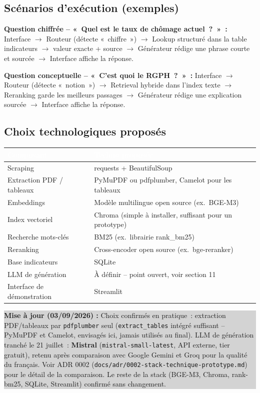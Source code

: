 \documentclass[11pt,a4paper]{article}
\newcommand{\tblhead}[1]{\textcolor{white}{\textbf{#1}}}
\newcommand{\majcadrage}[1]{%
\par\vspace{0.35cm}
\noindent\colorbox{lightgrey}{%
\begin{minipage}{\dimexpr\linewidth-2\fboxsep}
\vspace{0.15cm}
\textbf{\color{gold}Mise \`a jour (03/09/2026) :} #1
\vspace{0.15cm}
\end{minipage}%
}
\vspace{0.35cm}
}
\begin{document}
\subsection{Sc\'enarios d'ex\'ecution (exemples)}
\textbf{Question chiffr\'ee -- «~Quel est le taux de ch\^omage actuel~?~»~:} Interface $\rightarrow$ Routeur (d\'etecte «~chiffre~») $\rightarrow$ Lookup structur\'e dans la table indicateurs $\rightarrow$ valeur exacte + source $\rightarrow$ G\'en\'erateur r\'edige une phrase courte et sourc\'ee $\rightarrow$ Interface affiche la r\'eponse.

\textbf{Question conceptuelle -- «~C'est quoi le RGPH~?~»~:} Interface $\rightarrow$ Routeur (d\'etecte «~notion~») $\rightarrow$ Retrieval hybride dans l'index texte $\rightarrow$ Reranking garde les meilleurs passages $\rightarrow$ G\'en\'erateur r\'edige une explication sourc\'ee $\rightarrow$ Interface affiche la r\'eponse.

\subsection{Choix technologiques propos\'es}
\begin{longtable}{@{}p{5cm}p{10.2cm}@{}}
\rowcolor{navy}
\tblhead{Composant} & \tblhead{Techno propos\'ee} \\
\midrule
\endhead
Scraping & requests + BeautifulSoup \\
Extraction PDF / tableaux & PyMuPDF ou pdfplumber, Camelot pour les tableaux \\
Embeddings & Mod\`ele multilingue open source (ex.\ BGE-M3) \\
Index vectoriel & Chroma (simple \`a installer, suffisant pour un prototype) \\
Recherche mots-cl\'es & BM25 (ex.\ librairie rank\_bm25) \\
Reranking & Cross-encoder open source (ex.\ bge-reranker) \\
Base indicateurs & SQLite \\
LLM de g\'en\'eration & \`A d\'efinir -- point ouvert, voir section 11 \\
Interface de d\'emonstration & Streamlit \\
\end{longtable}

\majcadrage{Choix confirm\'es en pratique~: extraction PDF/tableaux par \texttt{pdfplumber} seul (\texttt{extract\_tables} int\'egr\'e suffisant -- PyMuPDF et Camelot, envisag\'es ici, jamais utilis\'es au final). LLM de g\'en\'eration tranch\'e le 21 juillet~: \textbf{Mistral} (\texttt{mistral-small-latest}, API externe, tier gratuit), retenu apr\`es comparaison avec Google Gemini et Groq pour la qualit\'e du fran\c{c}ais. Voir ADR 0002 (\texttt{docs/adr/0002-stack-technique-prototype.md}) pour le d\'etail de la comparaison. Le reste de la stack (BGE-M3, Chroma, rank-bm25, SQLite, Streamlit) confirm\'e sans changement.}
\end{document}
